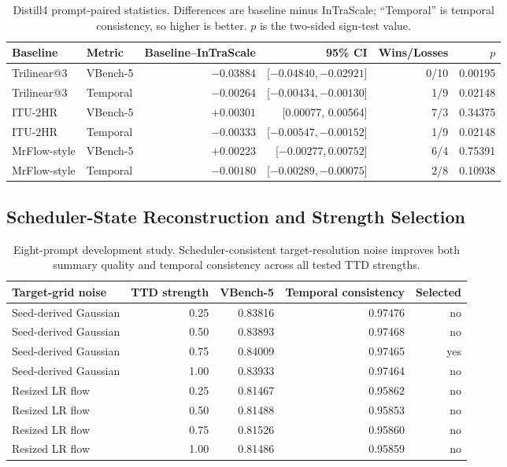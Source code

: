 \documentclass[letterpaper]{article}
\begin{document}
\begin{table}[H]
  \centering
  \small
  \setlength{\tabcolsep}{4pt}
  \begin{tabular}{llrrrr}
    \toprule
    Baseline & Metric & Baseline--InTraScale & 95\% CI & Wins/Losses & \(p\) \\
    \midrule
    Trilinear@3 & VBench-5 & \(-0.03884\) & [\(-0.04840,-0.02921\)] &
    0/10 & 0.00195 \\
    Trilinear@3 & Temporal & \(-0.00264\) & [\(-0.00434,-0.00130\)] &
    1/9 & 0.02148 \\
    ITU-2HR & VBench-5 & \(+0.00301\) & [0.00077, 0.00564] &
    7/3 & 0.34375 \\
    ITU-2HR & Temporal & \(-0.00333\) & [\(-0.00547,-0.00152\)] &
    1/9 & 0.02148 \\
    MrFlow-style & VBench-5 & \(+0.00223\) & [\(-0.00277,0.00752\)] &
    6/4 & 0.75391 \\
    MrFlow-style & Temporal & \(-0.00180\) & [\(-0.00289,-0.00075\)] &
    2/8 & 0.10938 \\
    \bottomrule
  \end{tabular}
  \caption{Distill4 prompt-paired statistics.  Differences are baseline minus
  InTraScale; ``Temporal'' is temporal consistency, so higher is better.
  \(p\) is the two-sided sign-test value.}
  \label{tab:distill4-stats}
\end{table}

\subsection{Scheduler-State Reconstruction and Strength Selection}

\begin{table}[H]
  \centering
  \small
  \setlength{\tabcolsep}{4pt}
  \begin{tabular}{lrrrr}
    \toprule
    Target-grid noise & TTD strength & VBench-5 & Temporal consistency & Selected \\
    \midrule
    Seed-derived Gaussian & 0.25 & 0.83816 & 0.97476 & no \\
    Seed-derived Gaussian & 0.50 & 0.83893 & 0.97468 & no \\
    Seed-derived Gaussian & 0.75 & 0.84009 & 0.97465 & yes \\
    Seed-derived Gaussian & 1.00 & 0.83933 & 0.97464 & no \\
    Resized LR flow & 0.25 & 0.81467 & 0.95862 & no \\
    Resized LR flow & 0.50 & 0.81488 & 0.95853 & no \\
    Resized LR flow & 0.75 & 0.81526 & 0.95860 & no \\
    Resized LR flow & 1.00 & 0.81486 & 0.95859 & no \\
    \bottomrule
  \end{tabular}
  \caption{Eight-prompt development study.  Scheduler-consistent
  target-resolution noise improves both summary quality and temporal
  consistency across all tested TTD strengths.}
  \label{tab:state-reconstruction}
\end{table}
\end{document}
